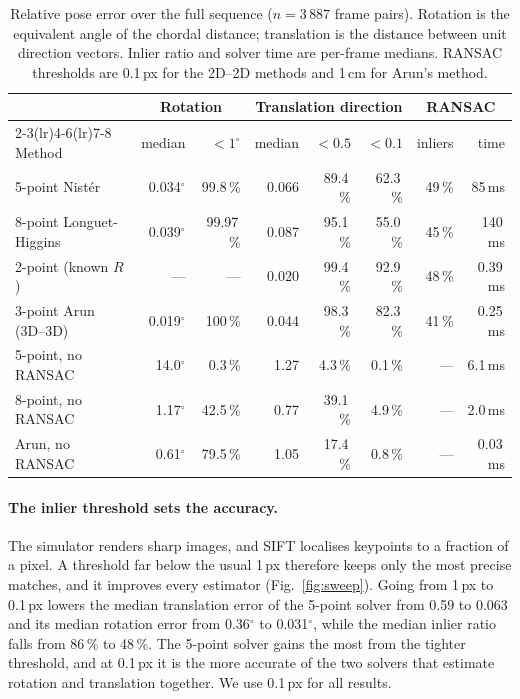 \documentclass[11pt,a4paper]{article}
\begin{document}
\begin{table}[t]
  \centering\small
  \caption{Relative pose error over the full sequence ($n = 3\,887$ frame pairs). Rotation
    is the equivalent angle of the chordal distance; translation is the distance between
    unit direction vectors. Inlier ratio and solver time are per-frame medians. RANSAC
    thresholds are 0.1\,px for the 2D--2D methods and 1\,cm for Arun's method.}
  \label{tab:stats}
  \setlength{\tabcolsep}{4.5pt}
  \begin{tabular}{l rr rrr rr}
    \toprule
    & \multicolumn{2}{c}{Rotation} & \multicolumn{3}{c}{Translation direction}
    & \multicolumn{2}{c}{RANSAC} \\
    \cmidrule(lr){2-3}\cmidrule(lr){4-6}\cmidrule(lr){7-8}
    Method & median & $< 1^\circ$ & median & $< 0.5$ & $< 0.1$ & inliers & time \\
    \midrule
    5-point Nist\'er           & 0.034$^\circ$ & 99.8\,\% & 0.066 & 89.4\,\% & 62.3\,\% & 49\,\% & 85\,ms \\
    8-point Longuet-Higgins    & 0.039$^\circ$ & 99.97\,\% & 0.087 & 95.1\,\% & 55.0\,\% & 45\,\% & 140\,ms \\
    2-point (known $R$)        & ---          & ---       & 0.020 & 99.4\,\% & 92.9\,\% & 48\,\% & 0.39\,ms \\
    3-point Arun (3D--3D)      & 0.019$^\circ$ & 100\,\%  & 0.044 & 98.3\,\% & 82.3\,\% & 41\,\% & 0.25\,ms \\
    \midrule
    5-point, no RANSAC         & 14.0$^\circ$ & 0.3\,\%   & 1.27  & 4.3\,\%  & 0.1\,\% & --- & 6.1\,ms \\
    8-point, no RANSAC         & 1.17$^\circ$ & 42.5\,\%  & 0.77  & 39.1\,\% & 4.9\,\% & --- & 2.0\,ms \\
    Arun, no RANSAC            & 0.61$^\circ$ & 79.5\,\%  & 1.05  & 17.4\,\% & 0.8\,\% & --- & 0.03\,ms \\
    \bottomrule
  \end{tabular}
\end{table}

\paragraph{The inlier threshold sets the accuracy.}
The simulator renders sharp images, and SIFT localises keypoints to a fraction of a
pixel. A threshold far below the usual 1\,px therefore keeps only the most precise
matches, and it improves every estimator (Fig.~\ref{fig:sweep}). Going from 1\,px to
0.1\,px lowers the median translation error of the 5-point solver from 0.59 to 0.063
and its median rotation error from 0.36$^\circ$ to 0.031$^\circ$, while the median
inlier ratio falls from 86\,\% to 48\,\%. The 5-point solver gains the most from the
tighter threshold, and at 0.1\,px it is the more accurate of the two solvers that
estimate rotation and translation together. We use 0.1\,px for all results.
\end{document}
